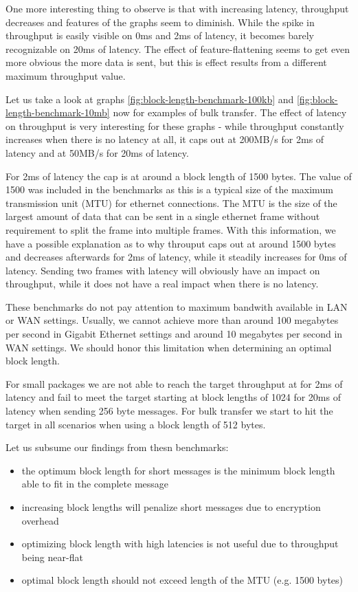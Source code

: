 One more interesting thing to observe is that with increasing latency, throughput decreases and features of the graphs seem to diminish.
While the spike in throughput is easily visible on 0ms and 2ms of latency, it becomes barely recognizable on 20ms of latency.
The effect of feature-flattening seems to get even more obvious the more data is sent, but this is effect results from a different maximum throughput value.

Let us take a look at graphs \ref{fig:block-length-benchmark-100kb} and \ref{fig:block-length-benchmark-10mb} now for examples of bulk transfer.
The effect of latency on throughput is very interesting for these graphs - while throughput constantly increases when there is no latency at all, it caps out at 200MB/s for 2ms of latency and at 50MB/s for 20ms of latency.

For 2ms of latency the cap is at around a block length of 1500 bytes.
The value of 1500 was included in the benchmarks as this is a typical size of the maximum transmission unit (MTU) for ethernet connections.
The MTU is the size of the largest amount of data that can be sent in a single ethernet frame without requirement to split the frame into multiple frames.
With this information, we have a possible explanation as to why throuput caps out at around 1500 bytes and decreases afterwards for 2ms of latency, while it steadily increases for 0ms of latency.
Sending two frames with latency will obviously have an impact on throughput, while it does not have a real impact when there is no latency.

\medskip

These benchmarks do not pay attention to maximum bandwith available in LAN or WAN settings.
Usually, we cannot achieve more than around 100 megabytes per second in Gigabit Ethernet settings and around 10 megabytes per second in WAN settings.
We should honor this limitation when determining an optimal block length.

For small packages we are not able to reach the target throughput at for 2ms of latency and fail to meet the target starting at block lengths of 1024 for 20ms of latency when sending 256 byte messages.
For bulk transfer we start to hit the target in all scenarios when using a block length of 512 bytes.

\medskip

Let us subsume our findings from thesn benchmarks:
\begin{itemize}
    \item the optimum block length for short messages is the minimum block length able to fit in the complete message
    \item increasing block lengths will penalize short messages due to encryption overhead
    \item optimizing block length with high latencies is not useful due to throughput being near-flat
    \item optimal block length should not exceed length of the MTU (e.g. 1500 bytes)
\end{itemize}

